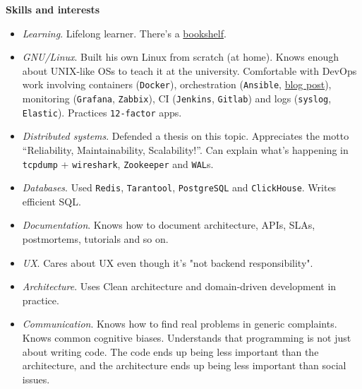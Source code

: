 \documentclass[final]{letter}
\def\code#1{\texttt{#1}}
\begin{document}
{\bf Skills and interests}
\begin{itemize}
  \item \textit{Learning}. Lifelong learner. There's a \href{https://www.goodreads.com/review/list/43338630-sergey-machulskis?shelf=professional}{bookshelf}.
  \item \textit{GNU/Linux}. Built his own Linux from scratch (at home). Knows enough about UNIX-like OSs to teach it at the university.
  Comfortable with DevOps work involving containers (\code{Docker}),
   orchestration (\code{Ansible}, \href{https://neexee.github.io/posts-en/ansible-secrets/}{blog post}),
   monitoring (\code{Grafana}, \code{Zabbix}), CI (\code{Jenkins}, \code{Gitlab})
   and logs (\code{syslog}, \code{Elastic}). Practices \code{12-factor} apps.
  \item \textit{Distributed systems}. Defended a thesis on this topic. Appreciates the motto ``Reliability, Maintainability, Scalability!''.
    Can explain what's happening in \code{tcpdump} + \code{wireshark}, \code{Zookeeper} and \code{WAL}s.
  \item \textit{Databases}. Used \code{Redis}, \code{Tarantool}, \code{PostgreSQL} and \code{ClickHouse}. Writes efficient SQL.
  \item \textit{Documentation}. Knows how to document architecture, APIs, SLAs, postmortems, tutorials and so on.
  \item \textit{UX}. Cares about UX even though it's "not backend responsibility".
  \item \textit{Architecture}. Uses Clean architecture and domain-driven development in practice.
  \item \textit{Communication}. Knows how to find real problems in generic complaints. 
    Knows common cognitive biases.
    Understands that programming is not just about writing code. The code ends up being less important than the architecture, and the architecture ends up being less important than social issues. 
\end{itemize}
\end{document}
